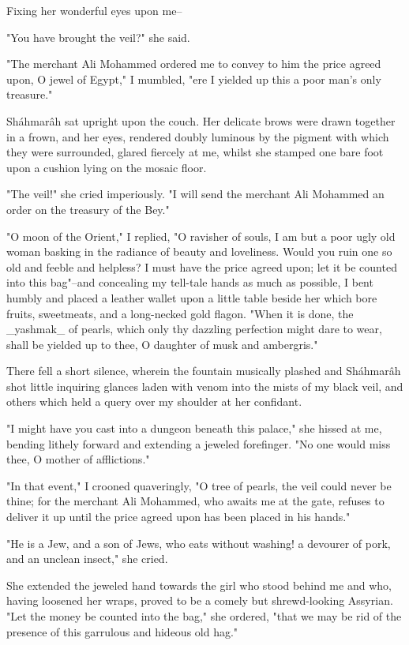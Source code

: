 Fixing her wonderful eyes upon me--

"You have brought the veil?" she said.

"The merchant Ali Mohammed ordered me to convey to him the price
agreed upon, O jewel of Egypt," I mumbled, "ere I yielded up this a
poor man's only treasure."

Sháhmarâh sat upright upon the couch. Her delicate brows were drawn
together in a frown, and her eyes, rendered doubly luminous by the
pigment with which they were surrounded, glared fiercely at me, whilst
she stamped one bare foot upon a cushion lying on the mosaic floor.

"The veil!" she cried imperiously. "I will send the merchant Ali
Mohammed an order on the treasury of the Bey."

"O moon of the Orient," I replied, "O ravisher of souls, I am but a
poor ugly old woman basking in the radiance of beauty and loveliness.
Would you ruin one so old and feeble and helpless? I must have the
price agreed upon; let it be counted into this bag"--and concealing
my tell-tale hands as much as possible, I bent humbly and placed a
leather wallet upon a little table beside her which bore fruits,
sweetmeats, and a long-necked gold flagon. "When it is done, the
_yashmak_ of pearls, which only thy dazzling perfection might dare to
wear, shall be yielded up to thee, O daughter of musk and ambergris."

There fell a short silence, wherein the fountain musically plashed and
Sháhmarâh shot little inquiring glances laden with venom into the
mists of my black veil, and others which held a query over my shoulder
at her confidant.

"I might have you cast into a dungeon beneath this palace," she hissed
at me, bending lithely forward and extending a jeweled forefinger. "No
one would miss thee, O mother of afflictions."

"In that event," I crooned quaveringly, "O tree of pearls, the veil
could never be thine; for the merchant Ali Mohammed, who awaits me at
the gate, refuses to deliver it up until the price agreed upon has
been placed in his hands."

"He is a Jew, and a son of Jews, who eats without washing! a devourer
of pork, and an unclean insect," she cried.

She extended the jeweled hand towards the girl who stood behind me
and who, having loosened her wraps, proved to be a comely but
shrewd-looking Assyrian. "Let the money be counted into the bag,"
she ordered, "that we may be rid of the presence of this garrulous
and hideous old hag."

